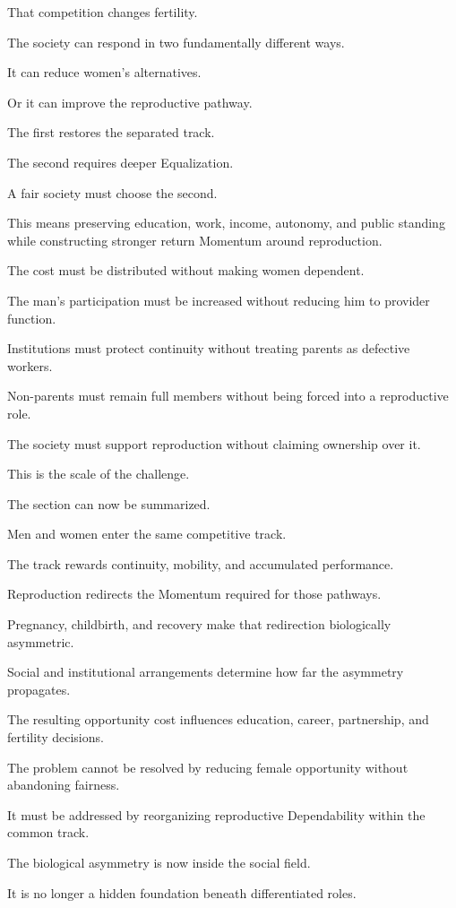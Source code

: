 That competition changes fertility.

The society can respond in two fundamentally different ways.

It can reduce women’s alternatives.

Or it can improve the reproductive pathway.

The first restores the separated track.

The second requires deeper Equalization.

A fair society must choose the second.

This means preserving education, work, income, autonomy, and public standing while constructing stronger return Momentum around reproduction.

The cost must be distributed without making women dependent.

The man’s participation must be increased without reducing him to provider function.

Institutions must protect continuity without treating parents as defective workers.

Non-parents must remain full members without being forced into a reproductive role.

The society must support reproduction without claiming ownership over it.

This is the scale of the challenge.

The section can now be summarized.

Men and women enter the same competitive track.

The track rewards continuity, mobility, and accumulated performance.

Reproduction redirects the Momentum required for those pathways.

Pregnancy, childbirth, and recovery make that redirection biologically asymmetric.

Social and institutional arrangements determine how far the asymmetry propagates.

The resulting opportunity cost influences education, career, partnership, and fertility decisions.

The problem cannot be resolved by reducing female opportunity without abandoning fairness.

It must be addressed by reorganizing reproductive Dependability within the common track.

The biological asymmetry is now inside the social field.

It is no longer a hidden foundation beneath differentiated roles.

